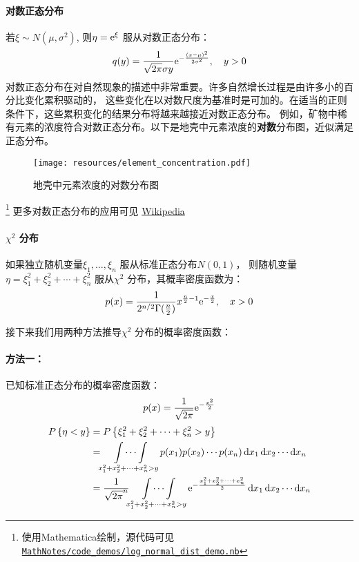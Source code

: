 \paragraph{对数正态分布}
若\(\xi\sim N(\mu,\sigma^{2})\), 则\(\eta=\mathrm{e}^{\xi} \) 服从对数正态分布：
\[
    q(y) = \frac{1}{\sqrt{2\pi}\sigma y}
    \mathrm{e}^{-\frac{(x-\mu)^{2}}{2\sigma^{2}}},\quad y>0
\]
对数正态分布在对自然现象的描述中非常重要。许多自然增长过程是由许多小的百分比变化累积驱动的，
这些变化在以对数尺度为基准时是可加的。在适当的正则条件下，这些累积变化的结果分布将越来越接近对数正态分布。
例如，矿物中稀有元素的浓度符合对数正态分布。以下是地壳中元素浓度的\textbf{对数}分布图，近似满足正态分布。
\begin{figure}[H]
    \centering
    \texttt{[image: resources/element\_concentration.pdf]}
    \caption{地壳中元素浓度的对数分布图}
    \label{fig:lognormal}
\end{figure}\footnote{使用Mathematica绘制，源代码可见
\href{https://github.com/Sazzzzzz/MathNotes/blob/main/code_demos/log_normal_dist_demo.nb}{\texttt{MathNotes/code_demos/log_normal_dist_demo.nb}}}
更多对数正态分布的应用可见
\href{https://en.wikipedia.org/wiki/Log-normal_distribution#Occurrence_and_applications}{Wikipedia}

\paragraph{\(\chi^{2}\) 分布}
如果独立随机变量\(\xi_{1}, \dots ,\xi_{n}\) 服从标准正态分布\(N(0,1)\)，
则随机变量\(\eta = \xi_{1}^{2} + \xi_{2}^{2} + \cdots +
\xi_{n}^{2}\) 服从\(\chi^{2}\) 分布，其概率密度函数为：
\[
    p(x) = \frac{1}{2^{n/2} \Gamma(\frac{n}{2})} x^{\frac{n}{2}-1}
    \mathrm{e}^{-\frac{x}{2}}, \quad x>0
\]

接下来我们用两种方法推导\(\chi^{2}\) 分布的概率密度函数：
\paragraph{方法一：}
已知标准正态分布的概率密度函数：\[
    p(x) = \frac{1}{\sqrt{2\pi}} \mathrm{e}^{-\frac{x^{2}}{2}}
\]
\begin{align*}
    \P{\eta<y} &= \P{\xi_{1}^{2} + \xi_{2}^{2} + \cdots +
    \xi_{n}^{2} > y} \\
    &= \idotsint\limits_{x_{1}^{2} + x_{2}^{2} + \cdots +
    x_{n}^{2} > y} p(x_{1}) p(x_{2}) \cdots p(x_{n}) \d{x}_{1}
    \d{x}_{2} \cdots \d{x}_{n} \\
    &= \frac{1}{\sqrt{2\pi}^{n}}
    \idotsint\limits_{x_{1}^{2} + x_{2}^{2} + \cdots + x_{n}^{2} > y}
    \e^{-\frac{x_{1}^{2}+ x_{2}^{2} +\dots + x_{n}^{2}}{2}}
    \d{x}_{1} \d{x}_{2} \cdots \d{x}_{n} \\
\end{align*}

